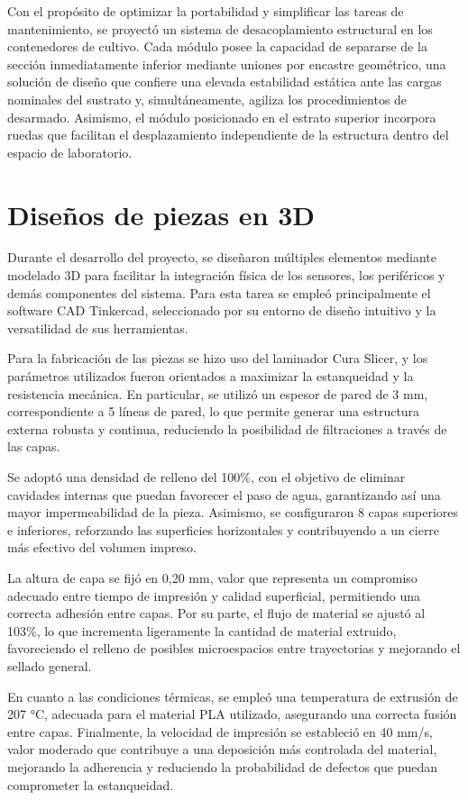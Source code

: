 Con el propósito de optimizar la portabilidad y simplificar las tareas de mantenimiento, se proyectó un sistema de desacoplamiento estructural en los contenedores de cultivo. Cada módulo posee la capacidad de separarse de la sección inmediatamente inferior mediante uniones por encastre geométrico, una solución de diseño que confiere una elevada estabilidad estática ante las cargas nominales del sustrato y, simultáneamente, agiliza los procedimientos de desarmado. Asimismo, el módulo posicionado en el estrato superior incorpora ruedas que facilitan el desplazamiento independiente de la estructura dentro del espacio de laboratorio.

\section{Diseños de piezas en 3D}
\label{sec:piezas_3d}

Durante el desarrollo del proyecto, se diseñaron múltiples elementos mediante modelado 3D para facilitar la integración física de los sensores, los periféricos y demás componentes del sistema. Para esta tarea se empleó principalmente el software CAD Tinkercad, seleccionado por su entorno de diseño intuitivo y la versatilidad de sus herramientas.

Para la fabricación de las piezas se hizo uso del laminador Cura Slicer, y los parámetros utilizados fueron orientados a maximizar la estanqueidad y la resistencia mecánica. En particular, se utilizó un espesor de pared de 3 mm, correspondiente a 5 líneas de pared, lo que permite generar una estructura externa robusta y continua, reduciendo la posibilidad de filtraciones a través de las capas.

Se adoptó una densidad de relleno del 100\%, con el objetivo de eliminar cavidades internas que puedan favorecer el paso de agua, garantizando así una mayor impermeabilidad de la pieza. Asimismo, se configuraron 8 capas superiores e inferiores, reforzando las superficies horizontales y contribuyendo a un cierre más efectivo del volumen impreso.

La altura de capa se fijó en 0,20 mm, valor que representa un compromiso adecuado entre tiempo de impresión y calidad superficial, permitiendo una correcta adhesión entre capas. Por su parte, el flujo de material se ajustó al 103\%, lo que incrementa ligeramente la cantidad de material extruido, favoreciendo el relleno de posibles microespacios entre trayectorias y mejorando el sellado general.

En cuanto a las condiciones térmicas, se empleó una temperatura de extrusión de 207 °C, adecuada para el material PLA utilizado, asegurando una correcta fusión entre capas. Finalmente, la velocidad de impresión se estableció en 40 mm/s, valor moderado que contribuye a una deposición más controlada del material, mejorando la adherencia y reduciendo la probabilidad de defectos que puedan comprometer la estanqueidad.

